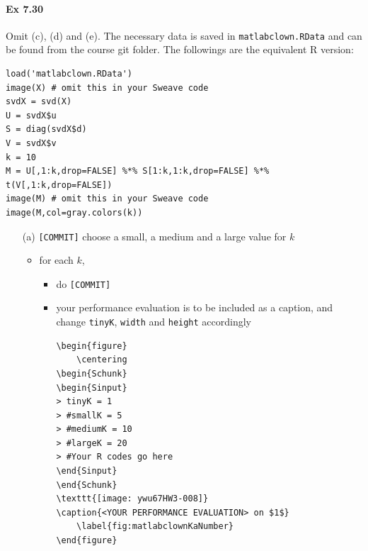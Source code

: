 \documentclass[12pt]{article}
\begin{document}
\paragraph{Ex 7.30}
Omit (c), (d) and (e). 
The necessary data is saved in \verb+matlabclown.RData+ 
and can be found from the course git folder.
The followings are the equivalent R version:
\begin{lstlisting}
load('matlabclown.RData')
image(X) # omit this in your Sweave code
svdX = svd(X)
U = svdX$u
S = diag(svdX$d)
V = svdX$v
k = 10
M = U[,1:k,drop=FALSE] %*% S[1:k,1:k,drop=FALSE] %*% t(V[,1:k,drop=FALSE])
image(M) # omit this in your Sweave code
image(M,col=gray.colors(k))
\end{lstlisting}
\begin{itemize}
    \item[(a)] \verb+[COMMIT]+ choose a small, a medium and a large value for $k$ 
         \begin{itemize}
             \item for each $k$, 
                 \begin{itemize}
             \item do \verb+[COMMIT]+ 
             \item your performance evaluation is to be included as a caption,
            and change \verb+tinyK+, \verb+width+ and \verb+height+ accordingly
\begin{lstlisting}
\begin{figure}
    \centering
\begin{Schunk}
\begin{Sinput}
> tinyK = 1
> #smallK = 5
> #mediumK = 10
> #largeK = 20
> #Your R codes go here
\end{Sinput}
\end{Schunk}
\texttt{[image: ywu67HW3-008]}
\caption{<YOUR PERFORMANCE EVALUATION> on $1$}
    \label{fig:matlabclownKaNumber}
\end{figure}
\end{lstlisting}
                 \end{itemize}
\begin{Schunk}
\end{Schunk}

\end{itemize}
\end{itemize}
\end{document}
